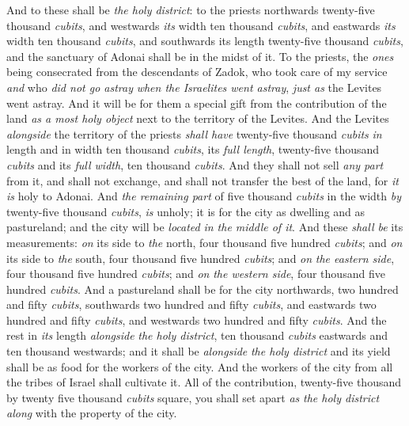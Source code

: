 \begin{biblechapter}
\verse And to these shall be \textit{the holy district}: to the priests northwards twenty-five thousand \textit{cubits}, and westwards \textit{its} width ten thousand \textit{cubits}, and eastwards \textit{its} width ten thousand \textit{cubits}, and southwards its length twenty-five thousand \textit{cubits}, and the sanctuary of Adonai shall be in the midst of it.
\verse To the priests, the \textit{ones} being consecrated from the descendants of Zadok, who took care of my service \textit{and} who \textit{did not go astray} \textit{when the Israelites went astray}, \textit{just as} the Levites went astray.
\verse And it will be for them a special gift from the contribution of the land \textit{as a most holy object} next to the territory of the Levites.
\verse And the Levites \textit{alongside} the territory of the priests \textit{shall have} twenty-five thousand \textit{cubits} \textit{in} length and in width ten thousand \textit{cubits}, its \textit{full length}, twenty-five thousand \textit{cubits} and its \textit{full width}, ten thousand \textit{cubits}.
\verse And they shall not sell \textit{any part} from it, and shall not exchange, and shall not transfer the best of the land, for \textit{it is} holy to Adonai.
\verse And \textit{the remaining part} of five thousand \textit{cubits} in the width \textit{by} twenty-five thousand \textit{cubits}, \textit{is} unholy; it is for the city as dwelling and as pastureland; and the city will be \textit{located} \textit{in the middle of it}.
\verse And these \textit{shall be} its measurements: \textit{on} its side to \textit{the} north, four thousand five hundred \textit{cubits}; and \textit{on} its side to \textit{the} south, four thousand five hundred \textit{cubits}; and \textit{on} \textit{the eastern side}, four thousand five hundred \textit{cubits}; and \textit{on} \textit{the western side}, four thousand five hundred \textit{cubits}.
\verse And a pastureland shall be for the city northwards, two hundred and fifty \textit{cubits}, southwards two hundred and fifty \textit{cubits}, and eastwards two hundred and fifty \textit{cubits}, and westwards two hundred and fifty \textit{cubits}.
\verse And the rest in \textit{its} length \textit{alongside} \textit{the holy district}, ten thousand \textit{cubits} eastwards and ten thousand westwards; and it shall be \textit{alongside} \textit{the holy district} and its yield shall be as food for the workers of the city.
\verse And the workers of the city from all the tribes of Israel shall cultivate it.
\verse All of the contribution, twenty-five thousand by twenty five thousand \textit{cubits} square, you shall set apart \textit{as} \textit{the holy district} \textit{along} with the property of the city.

\end{biblechapter}
